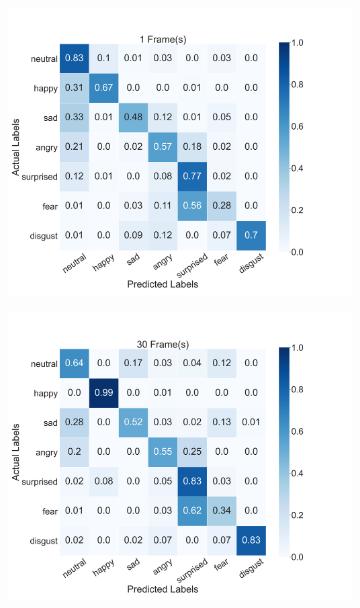 \begin{figure}
    \centering
    \begin{subfigure}[b]{0.45\textwidth}
      \includegraphics[width=\textwidth]{res/conf_fer_1.png}
    \end{subfigure}
    \begin{subfigure}[b]{0.45\textwidth}
      \includegraphics[width=\textwidth]{res/conf_fer_30.png}
    \end{subfigure}
    \begin{subfigure}[b]{0.45\textwidth}

\end{subfigure}
\end{figure}
